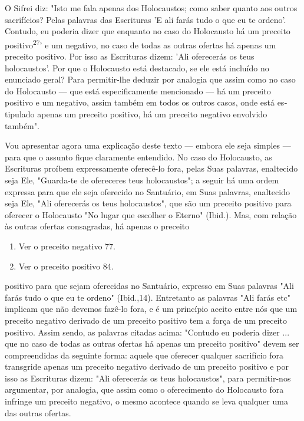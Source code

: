 \begin{itemize}
\begin{enumrate}
\begin{itemize}
\begin{itemize}
\begin{itemize}
O Sifrei diz: "Isto me fala apenas dos Holocaustos; como saber quanto
aos outros sacrifícios? Pelas palavras das Escrituras 'E ali farás tudo
o que eu te ordeno'. Contudo, eu poderia dizer que enquanto no caso do
Holocausto há um preceito positivo\textsuperscript{27}' e um negativo,
no caso de todas as outras ofertas há apenas um preceito positivo. Por
isso as Escrituras dizem: 'Ali oferecerás os teus holocaustos'. Por que
o Holocausto está destacado, se ele está incluído no enunciado geral?
Para permitir-lhe deduzir por analogia que assim como no ca­so do
Holocausto --- que está especificamente mencionado --- há um preceito
positivo e um negativo, assim também em todos os outros casos, onde está
es­tipulado apenas um preceito positivo, há um preceito negativo
envolvido também".

Vou apresentar agora uma explicação deste texto --- embora ele seja
simples --- para que o assunto fique claramente entendido. No caso do
Holo­causto, as Escrituras proíbem expressamente oferecê-lo fora, pelas
Suas pala­vras, enaltecido seja Ele, "Guarda-te de ofereceres teus
holocaustos"; a seguir há uma ordem expressa para que ele seja oferecido
no Santuário, em Suas pala­vras, enaltecido seja Ele, "Ali oferecerás os
teus holocaustos", que são um pre­ceito positivo para oferecer o
Holocausto "No lugar que escolher o Eterno" (Ibid.). Mas, com relação às
outras ofertas consagradas, há apenas o preceito


\begin{enumerate}
\def\labelenumi{\arabic{enumi}.}
\setcounter{enumi}{269}
\item
 
 Ver o preceito negativo 77.
 
\item
 
 Ver o preceito positivo 84.
 
\end{enumerate}



positivo para que sejam oferecidas no Santuário, expresso em Suas
palavras "Ali farás tudo o que eu te ordeno" (Ibid.,14). Entretanto as
palavras "Ali farás etc" implicam que não devemos fazê-lo fora, e é um
princípio aceito entre nós que um preceito negativo derivado de um
preceito positivo tem a força de um pre­ceito positivo. Assim sendo, as
palavras citadas acima: "Contudo eu poderia dizer ... que no caso de
todas as outras ofertas há apenas um preceito positivo" devem ser
compreendidas da seguinte forma: aquele que oferecer qualquer
sa­crifício fora transgride apenas um preceito negativo derivado de um
preceito positivo e por isso as Escrituras dizem: "Ali oferecerás os
teus holocaustos", para permitir-nos argumentar, por analogia, que assim
como o oferecimento do Holocausto fora infringe um preceito negativo, o
mesmo acontece quando se leva qualquer uma das outras ofertas.


\end{itemize}
\end{itemize}
\end{itemize}
\end{enumrate}
\end{itemize}
